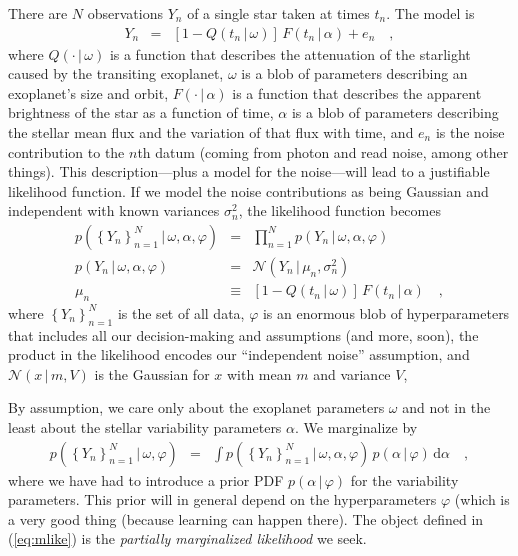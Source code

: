 \documentclass[12pt,letterpaper]{article}
\newcommand{\dd}{\mathrm{d}}
\newcommand{\given}{\,|\,}
\newcommand{\setof}[1]{\left\{{#1}\right\}}
\newcommand{\datum}{Y}
\newcommand{\data}{\setof{\datum_n}_{n=1}^N}
\renewcommand{\time}{t}
\newcommand{\exofn}{Q}
\newcommand{\exopars}{\omega}
\newcommand{\flux}{F}
\newcommand{\lcpars}{\alpha}
\newcommand{\noise}{e}
\newcommand{\variance}{\sigma^2}
\newcommand{\hyperpars}{\varphi}
\newcommand{\normal}{{\mathcal N}}
\newcommand{\mean}{\mu}
\begin{document}
There are $N$ observations $\datum_n$ of a single star taken at times $\time_n$.
The model is
\begin{eqnarray}
\datum_n &=& [1 - \exofn(t_n\given\exopars)]\,\flux(t_n\given\lcpars) + \noise_n
\quad ,
\end{eqnarray}
where
$\exofn(\cdot\given\exopars)$ is a function
that describes the attenuation of the starlight caused by the transiting exoplanet,
$\exopars$ is a blob of parameters describing an exoplanet's size and orbit,
$\flux(\cdot\given\lcpars)$ is a function
that describes the apparent brightness of the star as a function of time,
$\lcpars$ is a blob of parameters describing the stellar mean flux and the
variation of that flux with time,
and $\noise_n$ is the noise contribution to the $n$th datum
(coming from photon and read noise, among other things).
This description---plus a model for the noise---will lead to a justifiable likelihood function.
If we model the noise contributions as being Gaussian and independent
with known variances $\variance_n$, the likelihood function becomes
\begin{eqnarray}
p(\data\given\exopars,\lcpars,\hyperpars)
  &=& \prod_{n=1}^N p(\datum_n\given\exopars,\lcpars,\hyperpars)
\label{eq:like}
\\
p(\datum_n\given\exopars,\lcpars,\hyperpars)
  &=& \normal(\datum_n\given\mean_n,\variance_n)
\\
\mean_n
  &\equiv& [1 - \exofn(t_n\given\exopars)]\,\flux(t_n\given\lcpars)
\quad ,
\end{eqnarray}
where
$\data$ is the set of all data,
$\hyperpars$ is an enormous blob of hyperparameters
that includes all our decision-making and assumptions (and more, soon),
the product in the likelihood encodes our ``independent noise'' assumption,
and $\normal(x\given m,V)$ is the Gaussian for $x$ with mean $m$ and variance $V$,

By assumption, we care only about the exoplanet parameters $\exopars$
and not in the least about the stellar variability parameters $\lcpars$.
We marginalize by
\begin{eqnarray}
p(\data\given\exopars,\hyperpars)
  &=& \int p(\data\given\exopars,\lcpars,\hyperpars)\,p(\lcpars\given\hyperpars)\,\dd\lcpars
\label{eq:mlike}
\quad ,
\end{eqnarray}
where
we have had to introduce a prior PDF $p(\lcpars\given\hyperpars)$ for the variability parameters.
This prior will in general depend on the hyperparameters $\hyperpars$
(which is a very good thing (because learning can happen there).
The object defined in (\ref{eq:mlike}) is the \emph{partially marginalized likelihood}
we seek.
\end{document}
